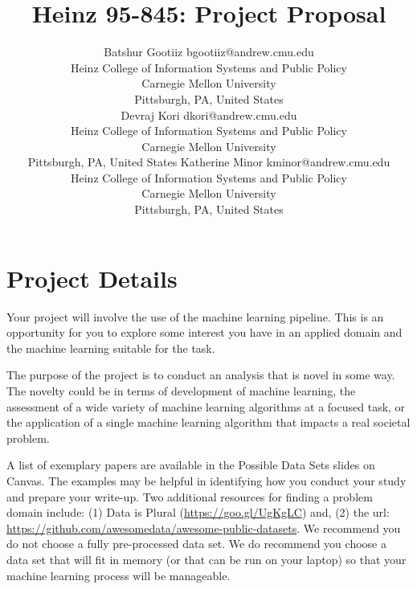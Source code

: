 \documentclass[twoside,11pt]{article}
\begin{document}
\title{Heinz 95-845: Project Proposal}

\author{\name Batshur Gootiiz \email bgootiiz@andrew.cmu.edu \\
       \addr Heinz College of Information Systems and Public Policy\\
       Carnegie Mellon University\\
       Pittsburgh, PA, United States \\
       \AND
       \name Devraj Kori \email dkori@andrew.cmu.edu \\
       \addr Heinz College of Information Systems and Public Policy\\
       Carnegie Mellon University\\
       Pittsburgh, PA, United States
       \AND
       \name Katherine Minor \email kminor@andrew.cmu.edu \\
       \addr Heinz College of Information Systems and Public Policy\\
       Carnegie Mellon University\\
       Pittsburgh, PA, United States}
       
\maketitle


\section{Project Details}
Your project will involve the use of the machine learning pipeline. This is an opportunity for you to explore some interest you have in an applied domain and the machine learning suitable for the task.

The purpose of the project is to conduct an analysis that is novel in some way. The novelty could be in terms of development of machine learning, the assessment of a wide variety of machine learning algorithms at a focused task, or the application of a single machine learning algorithm that impacts a real societal problem.

A list of exemplary papers are available in the Possible Data Sets slides on Canvas. The examples may be helpful in identifying how you conduct your study and prepare your write-up. Two additional resources for finding a problem domain include: (1) Data is Plural (\url{https://goo.gl/UgKgLC}) and, (2) the url: \url{https://github.com/awesomedata/awesome-public-datasets}. We recommend you do not choose a fully pre-processed data set. We do recommend you choose a data set that will fit in memory (or that can be run on your laptop) so that your machine learning process will be manageable.
\end{document}
